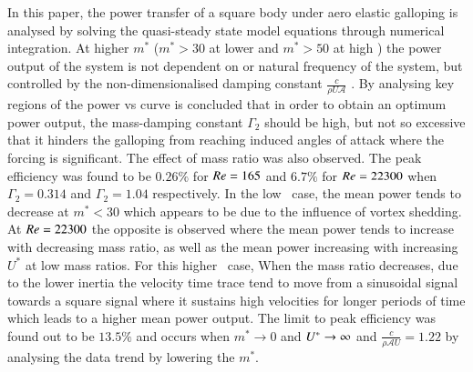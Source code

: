In this paper, the power transfer of a square body under aero elastic galloping is analysed by solving the quasi-steady state model equations through numerical integration. At higher $m^*$ ($m^*>30$ at lower \reynoldsnumber and $m^*> 50$ at high \reynoldsnumber) the power output of the system is not dependent on \ustar or natural frequency of the system, but controlled by the non-dimensionalised damping constant $\frac{c}{\rho U \mathcal{A}}$ . By analysing key regions of the power vs \ustar curve is concluded that in order to obtain an optimum power output, the mass-damping constant $\Gamma_2$ should be high, but not so excessive that it hinders the galloping from reaching induced angles of attack where the forcing is significant. The effect of mass ratio was also observed. The peak efficiency was found to be $0.26\%$ for $Re=165$ and $6.7\%$ for $Re=22300$  when $\Gamma_2=0.314$ and $\Gamma_2=1.04$ respectively. In the low \reynoldsnumber\ case, the mean power tends to decrease at $m^*<30$ which appears to be due to the influence of vortex shedding. At $Re=22300$ the opposite is observed where the mean power tends to increase with decreasing mass ratio, as well as the mean power increasing with increasing $U^*$ at low mass ratios. For this higher \reynoldsnumber\ case, When the mass ratio decreases, due to the lower inertia the velocity time trace tend to move from a sinusoidal signal towards a square signal where it sustains high velocities for longer periods of time which leads to a higher mean power output. The limit to peak efficiency was found out to be $13.5\%$ and occurs when $m^*\rightarrow 0$ and $U^{*} \rightarrow \infty$ and $\frac{c}{\rho \mathcal{A}U}=1.22$ by analysing the data trend by lowering the $m^*$.


